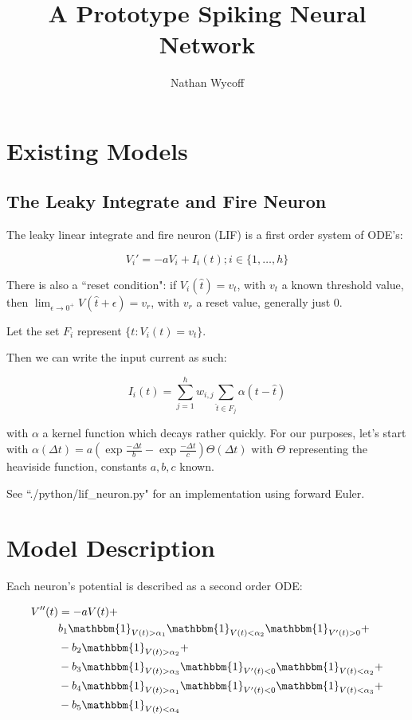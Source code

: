 \documentclass[a4paper]{article}
\title{A Prototype Spiking Neural Network}
\author{Nathan Wycoff}
\begin{document}
\maketitle

\section{Existing Models}

\subsection{The Leaky Integrate and Fire Neuron}

The leaky linear integrate and fire neuron (LIF) is a first order system of ODE's:

$$
V_i' = -aV_i + I_i(t); i \in \{1, \ldots, h\}
$$

There is also a ``reset condition": if $V_i (\hat{t})= v_t$, with $v_t$ a known threshold value, then $\lim_{\epsilon\to 0^+} V(\hat{t} + \epsilon) = v_r$, with $v_r$ a reset value, generally just 0.

Let the set $F_i$ represent $\{t : V_i(t) = v_t\}$.

Then we can write the input current as such:

$$
I_i(t)= \sum_{j=1}^h w_{i,j} \sum_{\hat{t} \in F_j} \alpha(t - \hat{t})
$$

with $\alpha$ a kernel function which decays rather quickly. For our purposes, let's start with $\alpha(\Delta t) = a (\exp{\frac{-\Delta t}{b}} - \exp{\frac{-\Delta t}{c}}) \Theta(\Delta t)$ with $\Theta$ representing the heaviside function, constants $a, b, c$ known.

See ``./python/lif\_neuron.py" for an implementation using forward Euler.


\section{Model Description}

Each neuron's potential is described as a second order ODE:

\begin{equation} \label{eq1}
\begin{split}
V''(t) & = -aV(t) + \\
 & b_1 \mathbbm{1}_{V(t) > \alpha_1}\mathbbm{1}_{V(t) < \alpha_2}\mathbbm{1}_{V'(t) > 0} + \\
& -b_2 \mathbbm{1}_{V(t) > \alpha_2} + \\
& -b_3 \mathbbm{1}_{V(t) > \alpha_3} \mathbbm{1}_{V'(t) < 0} \mathbbm{1}_{V(t) < \alpha_2} + \\
& -b_4 \mathbbm{1}_{V(t) > \alpha_1} \mathbbm{1}_{V'(t) < 0} \mathbbm{1}_{V(t) < \alpha_3} + \\
& -b_5 \mathbbm{1}_{V(t) < \alpha_4} 
\end{split}
\end{equation}
\end{document}
